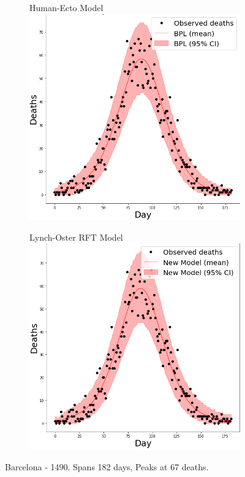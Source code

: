 \documentclass [letterpaper, 12pt] {article}
\begin{document}
\begin{figure}[H]
\begin{subfigure}{0.5\textwidth}
	\end{subfigure}
	\begin{subfigure}{0.5\textwidth}
		\centering
		Human-Ecto Model
		\includegraphics[width=\linewidth]{h_ecto/barcelona}
	\end{subfigure}\hspace{\fill}
	\begin{subfigure}{0.5\textwidth}
		\centering
		Lynch-Oster RFT Model
		\includegraphics[width=\linewidth]{rats2/barcelona}
	\end{subfigure}
	\caption{Barcelona - 1490. Spans 182 days, Peaks at 67 deaths.}
\end{figure}
\end{document}
